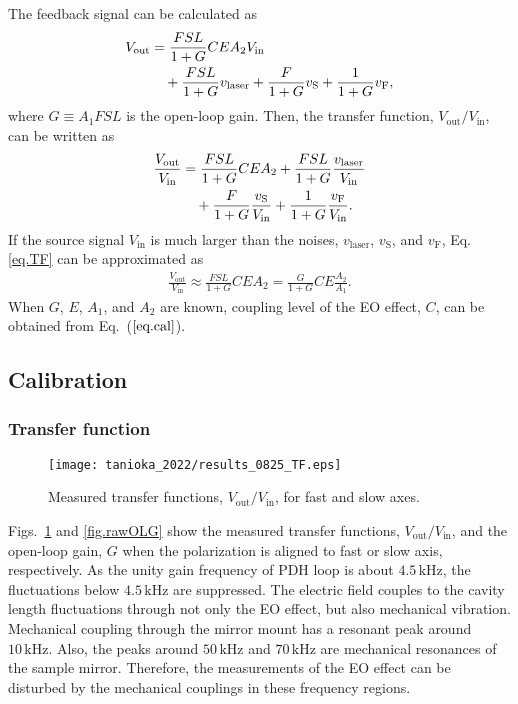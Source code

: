 The feedback signal can be calculated as
\begin{align}
    V_{\mathrm{out}}
    &= \frac{{FSL}}{1+{G}}CEA_2V_{\mathrm{in}} \notag \\ &\quad + \frac{{FSL}}{1+{G}}v_{\mathrm{laser}} + \frac{{F}}{1+{G}}v_{\mathrm{S}} + \frac{1}{1+{G}}v_{\mathrm{F}},
\end{align}
where $G \equiv A_1FSL$ is the open-loop gain.
Then, the transfer function, $V_{\mathrm{out}}/V_{\mathrm{in}}$, can be written as
\begin{align}
    \frac{V_{\mathrm{out}}}{V_{\mathrm{in}}} &= \frac{{FSL}}{1+{G}}{CEA}_2 + \frac{{FSL}}{1+{G}}\frac{v_{\mathrm{laser}}}{V_{\mathrm{in}}} \notag \\ &\quad + \frac{{F}}{1+{G}}\frac{v_{\mathrm{S}}}{V_{\mathrm{in}}} + \frac{1}{1+{G}}\frac{v_{\mathrm{F}}}{V_{\mathrm{in}}}.
    \label{eq.TF}
\end{align}
If the source signal $V_{\mathrm{in}}$ is much larger than the noises, $v_{\mathrm{laser}}$, $v_{\mathrm{S}}$, and $v_{\mathrm{F}}$, Eq. \ref{eq.TF} can be approximated as
\begin{align}
    \frac{V_{\mathrm{out}}}{V_{\mathrm{in}}} \approx \frac{FSL}{1+G}CEA_2 = \frac{G}{1+G}CE\frac{A_2}{A_1}.
    \label{eq.cal}
\end{align}
When $G$, $E$, $A_1$, and $A_2$ are known, coupling level of the EO effect, $C$, can be obtained from Eq.~($\ref{eq.cal}$).

\subsection{Calibration}

\subsubsection{Transfer function}

\begin{figure}[htbp]
    \centering
\texttt{[image: tanioka\_2022/results\_0825\_TF.eps]}
\caption{
Measured transfer functions, $V_{\mathrm{out}}/V_{\mathrm{in}}$, for fast and slow axes.
}
\label{fig.rawTF}
\end{figure}

Figs.~\ref{fig.rawTF} and \ref{fig.rawOLG} show the measured transfer functions, $V_{\mathrm{out}}/V_{\mathrm{in}}$, and the open-loop gain, $G$ when the polarization is aligned to fast or slow axis, respectively.
As the unity gain frequency of PDH loop is about $4.5\, \mathrm{kHz}$, the fluctuations below $4.5\, \mathrm{kHz}$ are suppressed.
The electric field couples to the cavity length fluctuations through not only the EO effect, but also mechanical vibration.
Mechanical coupling through the mirror mount has a resonant peak around $10\, \mathrm{kHz}$.
Also, the peaks around $50\, \mathrm{kHz}$ and $70\, \mathrm{kHz}$ are mechanical resonances of the sample mirror.
Therefore, the measurements of the EO effect can be disturbed by the mechanical couplings in these frequency regions.

